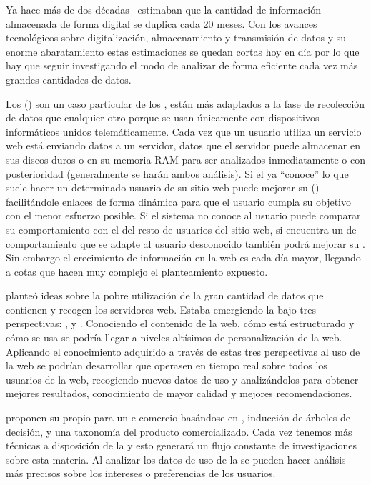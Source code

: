 Ya hace más de dos décadas~\citet{FrawleyPiatetskyMatheus-KDDOverview-1992} estimaban que la cantidad de información almacenada de forma digital se duplica cada 20 meses. Con los avances tecnológicos sobre digitalización, almacenamiento y transmisión de datos y su enorme abaratamiento estas estimaciones se quedan cortas hoy en día por lo que hay que seguir investigando el modo de analizar de forma eficiente cada vez más grandes cantidades de datos.%

Los \srws (\SRW) son un caso particular de los \srs, están más adaptados a la fase de recolección de datos que cualquier otro \SR porque se usan únicamente con dispositivos informáticos unidos telemáticamente. Cada vez que un usuario utiliza un servicio web está enviando datos a un servidor, datos que el servidor puede almacenar en sus discos duros o en su memoria RAM para ser analizados inmediatamente o con posterioridad (generalmente se harán ambos análisis). Si el \SRW ya "`conoce"' lo que suele hacer un determinado usuario de su sitio web puede mejorar su \ux (\UX) facilitándole enlaces de forma dinámica para que el usuario cumpla su objetivo con el menor esfuerzo posible. Si el sistema no conoce al usuario puede comparar su comportamiento con el del resto de usuarios del sitio web, si encuentra un \patron de comportamiento que se adapte al usuario desconocido también podrá mejorar su \UX. Sin embargo el crecimiento de información en la web es cada día mayor, llegando a cotas que hacen muy complejo el planteamiento expuesto.

\citet{Etzioni-TheWWWQuagmireOrGoldMine-1996} planteó ideas sobre la pobre utilización de la gran cantidad de datos que contienen y recogen los servidores web. Estaba emergiendo la \wm bajo tres perspectivas: \wsm, \wcm y \wum. Conociendo el contenido de la web, cómo está estructurado y cómo se usa se podría llegar a niveles altísimos de personalización de la web. Aplicando el conocimiento adquirido a través de estas tres perspectivas al uso de la web se podrían desarrollar \srws que operasen en tiempo real sobre todos los usuarios de la web, recogiendo nuevos datos de uso y analizándolos para obtener mejores resultados, conocimiento de mayor calidad y mejores recomendaciones.

\citet{ChoKimKim-PersonalizedRecommenderSystem-2002} proponen su propio \srw para un e-comercio basándose en \wum, inducción de árboles de decisión, \arm y una taxonomía del producto comercializado. Cada vez tenemos más técnicas a disposición de la \KDD y esto generará un flujo constante de investigaciones sobre esta materia. Al analizar los datos de uso de la \WWW se pueden hacer análisis más precisos sobre los intereses o preferencias de los usuarios.

